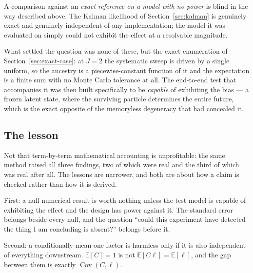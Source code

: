 \documentclass[11pt]{article}
\newcommand{\E}{\mathbb{E}}
\begin{document}
A comparison against an \emph{exact reference on a model with no power} is
blind in the way described above. The Kalman likelihood of
Section~\ref{sec:kalman} is genuinely exact and genuinely independent of
any implementation; the model it was evaluated on simply could not
exhibit the effect at a resolvable magnitude.

What settled the question was none of these, but the exact enumeration of
Section~\ref{sec:exact-case}: at $J=2$ the systematic sweep is
driven by a single uniform, so the ancestry is a piecewise-constant
function of it and the expectation is a finite sum with no Monte Carlo
tolerance at all. The end-to-end test that accompanies it was then built
specifically to be \emph{capable} of exhibiting the bias --- a frozen
latent state, where the surviving particle determines the entire future,
which is the exact opposite of the memoryless degeneracy that had
concealed it.

\subsection{The lesson}

Not that term-by-term mathematical accounting is unprofitable: the same
method raised all three findings, two of which were real and the third of
which was real after all. The lessons are narrower, and both are about
how a claim is checked rather than how it is derived.

First: a null numerical result is worth nothing unless the test model is
capable of exhibiting the effect and the design has power against it. The
standard error belongs beside every null, and the question ``could this
experiment have detected the thing I am concluding is absent?'' belongs
before it.

Second: a conditionally mean-one factor is harmless only if it is also
independent of everything downstream. $\E[C]=1$ is not
$\E[C\ell]=\E[\ell]$, and the gap between them is exactly
$\operatorname{Cov}(C,\ell)$.
\end{document}
